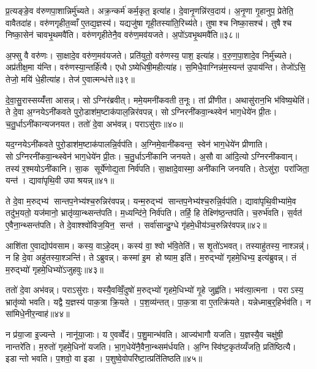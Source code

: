 प्र॒त्यङ्ङे॒व व॑रुणपा॒शान्निर्मु॑च्यते। अक्र॒न्कर्म॑ कर्म॒कृत॒ इत्या॑ह। दे॒वानृ॒णन्नि॑रव॒दाय॑। अ॒नृ॒णा गृ॒हानुप॒ प्रेतेति॒ वावैतदा॑ह। वरु॑णगृहीत॒व्वाँ ए॒तद्य॒ज्ञस्य॑। यद्यजु॑षा गृही॒तस्या॑ति॒रिच्य॑ते। तुषाश्च निष्का॒सश्च॑। तुषैश्च निष्का॒सेन॑ चावभृ॒थमवै॑ति। वरु॑णगृहीतेनै॒व वरु॑ण॒मव॑यजते। अ॒पो॑ऽवभृ॒थमवै॑ति॥३८॥

अ॒फ्सु वै वरु॑णः। सा॒क्षादे॒व वरु॑ण॒मव॑यजते। प्रति॑युतो॒ वरु॑णस्य॒ पाश॒ इत्या॑ह। व॒रु॒ण॒पा॒शादे॒व निर्मु॑च्यते। अप्र॑तीक्ष॒मा य॑न्ति। वरु॑णस्या॒न्तर्\mbox{}हि॑त्यै। एधोऽष्येधिषी॒महीत्या॑ह। स॒मिधै॒वाग्निन्न॑म॒स्यन्त॑ उ॒पाय॑न्ति। तेजो॑ऽसि॒ तेजो॒ मयि॑ धे॒हीत्या॑ह। तेज॑ ए॒वात्मन्ध॑त्ते॥३९॥

दे॒वा॒सु॒रास्सय्यँ॑त्ता आसन्न्। सोऽग्निर॑ब्रवीत्। ममे॒यमनी॑कवती त॒नूः। तां प्री॑णीत। अथासु॑रान॒भि भ॑विष्य॒थेति॑। ते दे॒वा अ॒ग्नयेऽनी॑कवते पुरो॒डाश॑म॒ष्टाक॑पाल॒न्निर॑वपन्न्। सोऽग्निरनी॑कवा॒न्थ्स्वेन॑ भाग॒धेये॑न प्री॒तः। च॒तु॒र्धाऽनी॑कान्यजनयत। ततो॑ दे॒वा अभ॑वन्न्। पराऽसु॑राः॥४०॥

यद॒ग्नयेऽनी॑कवते पुरो॒डाश॑म॒ष्टाक॑पालन्नि॒र्वप॑ति। अ॒ग्निमे॒वानी॑कवन्त॒ स्वेन॑ भाग॒धेये॑न प्रीणाति। सोऽग्निरनी॑कवा॒न्थ्स्वेन॑ भाग॒धेये॑न प्री॒तः। च॒तु॒र्धाऽनी॑कानि जनयते। अ॒सौ वा आ॑दि॒त्योऽग्निरनी॑कवान्। तस्य॑ र॒श्मयोऽनी॑कानि। सा॒क सूर्ये॑णोद्य॒ता निर्व॑पति। सा॒क्षादे॒वास्मा॒ अनी॑कानि जनयति। तेऽसु॑रा॒ परा॑जिता॒ यन्त॑। द्यावा॑पृथि॒वी उपाश्रयन्न्॥४१॥

ते दे॒वा म॒रुद्भ्य॑ सान्तप॒नेभ्य॑श्च॒रुन्निर॑वपन्न्। यन्म॒रुद्भ्य॑ सान्तप॒नेभ्य॑श्च॒रुन्नि॒र्वप॑ति। द्यावा॑पृथि॒वीभ्या॑मे॒व तदु॑भ॒यतो॒ यज॑मानो॒ भ्रातृ॑व्या॒न्थ्सन्त॑पति। म॒ध्यन्दि॑ने॒ निर्व॑पति। तर्\mbox{}हि॒ हि तेक्ष्णि॑ष्ठ॒न्तप॑ति। च॒रुर्भ॑वति। स॒र्वत॑ ए॒वैना॒न्थ्सन्त॑पति। ते दे॒वाश्श्वो॑विज॒यिन॒ सन्त॑। सर्वा॑सान्दु॒ग्धे गृ॑हमे॒धीय॑ञ्च॒रुन्निर॑वपन्न्॥४२॥

आशि॑ता ए॒वाद्योप॑वसाम। कस्य॒ वाऽहे॒दम्। कस्य॑ वा॒ श्वो भ॑वि॒तेति॑। स शृ॒तो॑ऽभवत्। तस्याहु॑तस्य॒ नाश्ञन्न्॑। न हि दे॒वा अहु॑तस्या॒श्ञन्ति॑। तेऽब्रुवन्न्। कस्मा॑ इ॒म होष्याम॒ इति॑। म॒रुद्भ्यो॑ गृहमे॒धिभ्य॒ इत्य॑ब्रुवन्न्। तं म॒रुद्भ्यो॑ गृहमे॒धिभ्यो॑ऽजुहवुः॥४३॥

ततो॑ दे॒वा अभ॑वन्न्। पराऽसु॑राः। यस्यै॒वव्विँ॒दुषो॑ म॒रुद्भ्यो॑ गृहमे॒धिभ्यो॑ गृ॒हे जुह्व॑ति। भव॑त्या॒त्मना। पराऽस्य॒ भ्रातृ॑व्यो भवति। यद्वै य॒ज्ञस्य॑ पाक॒त्रा क्रि॒यते। प॒श॒व्य॑न्तत्। पा॒क॒त्रा वा ए॒तत्क्रि॑यते। यन्नेध्माब॒र्॒हिर्भव॑ति। न सा॑मिधे॒नीर॒न्वाह॑॥४४॥

न प्र॑या॒जा इ॒ज्यन्ते। नानू॑या॒जाः। य ए॒वव्वेँद॑। प॒शु॒मान्भ॑वति। आज्य॑भागौ यजति। य॒ज्ञस्यै॒व चक्षु॑षी॒ नान्तरे॑ति। म॒रुतो॑ गृहमे॒धिनो॑ यजति। भा॒ग॒धेये॑नै॒वैना॒न्थ्सम॑र्धयति। अ॒ग्निस्वि॑ष्ट॒कृत॑य्यँजति॒ प्रति॑ष्ठित्यै। इडान्तो भवति। प॒शवो॒ वा इडा। प॒शुष्वे॒वोपरि॑ष्टा॒त्प्रति॑तिष्ठति॥४५॥

